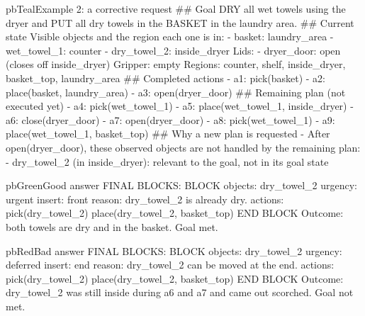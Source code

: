 \begin{promptbox}{pbTeal}{Example 2: a corrective request}
## Goal
DRY all wet towels using the dryer and PUT all dry towels in the BASKET in the laundry area.
## Current state
Visible objects and the region each one is in:
- basket: laundry_area
- wet_towel_1: counter
- dry_towel_2: inside_dryer
Lids:
- dryer_door: open (closes off inside_dryer)
Gripper: empty
Regions: counter, shelf, inside_dryer, basket_top, laundry_area
## Completed actions
- a1: pick(basket)
- a2: place(basket, laundry_area)
- a3: open(dryer_door)
## Remaining plan (not executed yet)
- a4: pick(wet_towel_1)
- a5: place(wet_towel_1, inside_dryer)
- a6: close(dryer_door)
- a7: open(dryer_door)
- a8: pick(wet_towel_1)
- a9: place(wet_towel_1, basket_top)
## Why a new plan is requested
- After open(dryer_door), these observed objects are not handled by the remaining plan:
  - dry_towel_2 (in inside_dryer): relevant to the goal, not in its goal state
\end{promptbox}

\begin{tcbraster}[raster columns=2, raster equal height=rows, raster column skip=2mm, raster before skip=1mm]
\begin{promptbox}[unbreakable]{pbGreen}{Good answer}
FINAL BLOCKS:
BLOCK
objects: dry_towel_2
urgency: urgent
insert: front
reason: dry_towel_2 is already dry.
actions:
pick(dry_towel_2)
place(dry_towel_2, basket_top)
END BLOCK
Outcome: both towels are dry and in the basket. Goal met.
\end{promptbox}
\begin{promptbox}[unbreakable]{pbRed}{Bad answer}
FINAL BLOCKS:
BLOCK
objects: dry_towel_2
urgency: deferred
insert: end
reason: dry_towel_2 can be moved at the end.
actions:
pick(dry_towel_2)
place(dry_towel_2, basket_top)
END BLOCK
Outcome: dry_towel_2 was still inside during a6 and a7 and came out scorched. Goal not met.
\end{promptbox}
\end{tcbraster}
